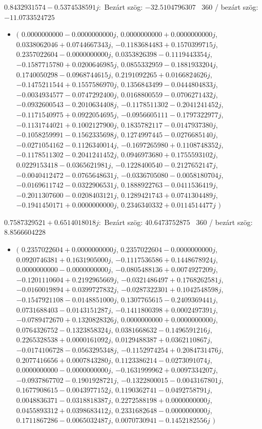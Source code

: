 \documentclass[14pt,a4paper]{article}
\begin{document}
$0.8432931574-0.5374538591j$:\
Bezárt szög: $-32.5104796307$ \
360 / bezárt szög: $-11.0733524725$\
\begin{itemize}
\item
$\big($
$0.0000000000-0.0000000000j$, $0.0000000000+0.0000000000j$, $0.0338062046+0.0744667343j$, $-0.1183684483+0.1570399715j$, $0.2357022604-0.0000000000j$, $0.0353826398-0.1119443354j$, $-0.1587715780+0.0200646985j$, $0.0855332959-0.1881933204j$, $0.1740050298-0.0968744615j$, $0.2191092265+0.0166824626j$, $-0.1475211544+0.1557586970j$, $0.1356843499-0.0444804833j$, $-0.0034934577-0.0747292400j$, $0.0168800559-0.0706271432j$, $-0.0932600543-0.2010634408j$, $-0.1178511302-0.2041241452j$, $-0.1171540975+0.0922054695j$, $-0.0956605111-0.1797322977j$, $-0.1131744021+0.1002127900j$, $0.1835782117-0.0147937380j$, $-0.1058259991-0.1562335698j$, $0.1274997445-0.0276685140j$, $-0.0271054162-0.1126340014j$, $-0.1697265980+0.1108748352j$, $-0.1178511302-0.2041241452j$, $0.0946973680+0.1755593102j$, $0.0229153418-0.0365621981j$, $-0.1228400540-0.2127652147j$, $-0.0040412472-0.0765648631j$, $-0.0336705080-0.0058180704j$, $-0.0169611742-0.0322906531j$, $0.1888922763-0.0411536419j$, $-0.2011307600-0.0208403121j$, $0.1289421743+0.0741304489j$, $-0.1941450171+0.0000000000j$, $0.2346340332+0.0114514477j$
$\big)$
\end{itemize}
$0.7587329521+0.6514018018j$:\
Bezárt szög: $40.6473752875$ \
360 / bezárt szög: $8.8566604228$\
\begin{itemize}
\item
$\big($
$0.2357022604+0.0000000000j$, $0.2357022604-0.0000000000j$, $0.0920746381+0.1631905000j$, $-0.1117536586+0.1448678924j$, $0.0000000000-0.0000000000j$, $-0.0805488136+0.0074927209j$, $-0.1201110604+0.2192965669j$, $-0.0321486497+0.1768262581j$, $-0.0160019894+0.0399727832j$, $-0.0287322301+0.1042548598j$, $-0.1547921108-0.0148851000j$, $0.1307765615-0.2409369441j$, $0.0731688403-0.0143151287j$, $-0.1411800398+0.0002497391j$, $-0.0789472670+0.1320828326j$, $0.0000000000+0.0000000000j$, $0.0764326752-0.1323858324j$, $0.0381668632-0.1496591216j$, $0.2265328538+0.0000161092j$, $0.0129488387+0.0362110867j$, $-0.0174106728-0.0563295348j$, $-0.1152974254+0.2084731476j$, $0.2077416656+0.0007843280j$, $0.1123386214-0.0273091074j$, $0.0000000000-0.0000000000j$, $-0.1631999962+0.0097334207j$, $-0.0937867702-0.1901928721j$, $-0.1322800015-0.0043167801j$, $0.1677908615-0.0043977152j$, $0.1190362741-0.0492758791j$, $0.0048836371-0.0318818387j$, $0.2272588198+0.0000000000j$, $0.0455893312+0.0398683412j$, $0.2331682648-0.0000000000j$, $0.1711867286-0.0065032487j$, $0.0070730941-0.1452182556j$
$\big)$
\end{itemize}
\end{document}
